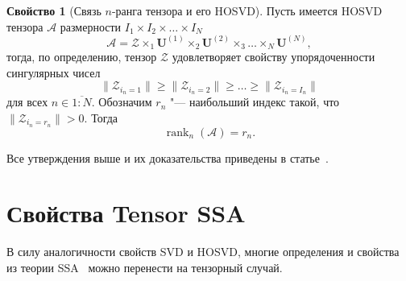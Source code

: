 \documentclass[specialist,
    substylefile = spbu_report.rtx,
    subf,href,colorlinks=true, 12pt]{disser}
\theoremstyle{plain}
\theoremstyle{definition}
\newtheorem{property}{Свойство}[section]
\theoremstyle{remark}
\begin{document}
    \begin{property}
        [Связь $n$-ранга тензора и его HOSVD]\label{property:n-rank}
        Пусть имеется HOSVD тензора $\mathcal{A}$ размерности $I_1\times I_2\times \ldots \times I_N$
        \[\mathcal{A} = \mathcal{Z}\times_1 \mathbf{U}^{(1)}\times_2\mathbf{U}^{(2)}\times_3\ldots \times_{N}\mathbf{U}^{(N)},\]
        тогда, по определению, тензор $\mathcal{Z}$ удовлетворяет свойству упорядоченности сингулярных чисел
        \[\|\mathcal{Z}_{i_n=1}\|\geqslant\|\mathcal{Z}_{i_n=2}\|\geqslant\ldots \geqslant \|\mathcal{Z}_{i_n=I_n}\|\]
        для всех $n\in \overline{1:N}$.
        Обозначим $r_n$ "--- наибольший индекс такой, что $\|\mathcal{Z}_{i_n=r_n}\|>0$.
        Тогда
        \begin{equation}
            \operatorname{rank}_n(\mathcal{A})=r_n.\label{eq:n-rank}
        \end{equation}
    \end{property}

    Все утверждения выше и их доказательства приведены в статье~\cite{hosvd}.


    \section{Свойства Tensor SSA}\label{sec:Tensor SSA-properties}
    В силу аналогичности свойств SVD и HOSVD, многие определения и свойства из теории SSA~\cite{ssa} можно перенести на тензорный случай.
\end{document}
